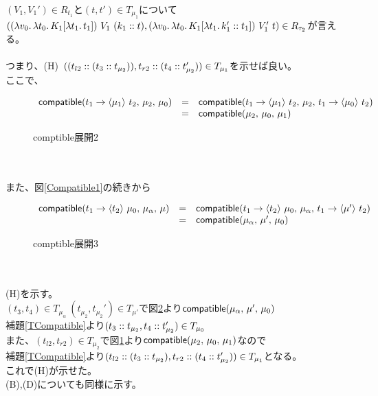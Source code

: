 $(V_1,V_1')\in R_{t_1}$と$(t,t')\in T_{\mu_1}$について\\
$(\LamP{v_0}{\Lam{t_0}{K_1[\Lam{t_1}{t_1}]}}\ V_1\ \ConsP{k_1}{t}, \LamP{v_0}{\Lam{t_0}{K_1[\Lam{t_1}{\Cons{k_1'}{t_1}}]}}\ V_1'\ t)
\in R_{\tau_2}$が言える。\\
\\
つまり、(H)\ $(\ConsP{t_{l2}}{\ConsP{t_3}{t_{\mu_2}}},\Cons{t_{r2}}{\ConsP{t_4}{t_{\mu_2}'}})\in T_{\mu_1}$を示せば良い。
\\
ここで、\\
\begin{figure}[h]
\[
\begin{array}{lcl}
  \Compatible{\Trail{t_1}{t_2}{\mu_1}}{\mu_2}{\mu_0} &=& \Compatible{\Trail{t_1}{t_2}{\mu_1}}{\mu_2}{\Trail{t_1}{t_2}{\mu_0}}\\
  &=& \Compatible{\mu_2}{\mu_0}{\mu_1}
\end{array}
\]
\caption{\textsf{comptible}展開2}
\label{Compatible2}
\end{figure}\\
\\
また、図\ref{Compatible1}の続きから\\
\begin{figure}[h]
\[
\begin{array}{lcl}
  \Compatible{\Trail{t_1}{\mu_0}{t_2}}{\mu_{\alpha}}{\mu} &=& \Compatible{\Trail{t_1}{\mu_0}{t_2}}{\mu_{\alpha}}{\Trail{t_1}{t_2}{\mu'}}\\
  &=& \Compatible{\mu_{\alpha}}{\mu'}{\mu_0}
\end{array}
\]
\caption{\textsf{comptible}展開3}
\label{Compatible3}
\end{figure}\\
\\
(H)を示す。\\
$(t_3,t_4)\in T_{\mu_{\alpha}}\ (t_{\mu_2},t_{\mu_2}')\in T_{\mu'}$で図\ref{Compatible3}より$\Compatible{\mu_{\alpha}}{\mu'}{\mu_0}$\\
補題\ref{TCompatible}より$(\Cons{t_3}{t_{\mu_2}},\Cons{t_4}{t_{\mu_2}'})\in T_{\mu_0}$\\
また、$(t_{l2},t_{r2})\in T_{\mu_2}$で図\ref{Compatible2}より$\Compatible{\mu_2}{\mu_0}{\mu_1}$なので\\
補題\ref{TCompatible}より$(\Cons{t_{l2}}{\ConsP{t_3}{t_{\mu_2}}},\Cons{t_{r2}}{\ConsP{t_4}{t_{\mu_2}'}})\in T_{\mu_1}$となる。\\
これで(H)が示せた。\\
(B),(D)についても同様に示す。\\


